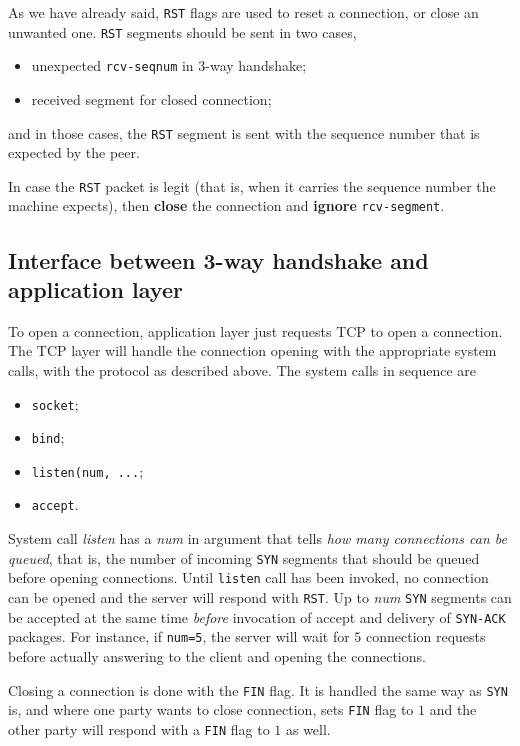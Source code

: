 \documentclass[10pt]{extbook}
\begin{document}
As we have already said, \texttt{RST} flags are used to reset a connection, or
close an unwanted one. \texttt{RST} segments should be sent in two cases,
\begin{itemize}
    \item unexpected \texttt{rcv-seqnum} in 3-way handshake;
    \item received segment for closed connection;
\end{itemize}
and in those cases, the \texttt{RST} segment is sent with the sequence number that is
expected by the peer.

In case the \texttt{RST} packet is legit (that is, when it carries the sequence number
the machine expects), then \textbf{close} the connection and \textbf{ignore}
\texttt{rcv-segment}.

\subsection{Interface between 3-way handshake and application layer}

To open a connection, application layer just requests TCP to open a connection.
The TCP layer will handle the connection opening with the appropriate system
calls, with the protocol as described above.
The system calls in sequence are

\begin{itemize}
	\item \texttt{socket};
    \item \texttt{bind};
    \item \texttt{listen(num, ...};
    \item \texttt{accept}.
\end{itemize}

System call \emph{listen} has a \emph{num} in argument that tells \emph{how many
connections can be queued}, that is, the number of incoming \texttt{SYN} segments that
should be queued before opening connections. Until \texttt{listen} call has
been invoked, no connection can be opened and the server will respond with
\texttt{RST}. Up to \emph{num} \texttt{SYN} segments can be accepted at the
same time \emph{before} invocation of accept and delivery of \texttt{SYN-ACK}
packages. For instance, if \texttt{num=5}, the server will wait for $5$
connection requests before actually answering to the client and opening the
connections.

Closing a connection is done with the \texttt{FIN} flag. It is handled the same
way as \texttt{SYN} is, and where one party wants to close connection, sets
\texttt{FIN} flag to $1$ and the other party will respond with a \texttt{FIN}
flag to $1$ as well.
\end{document}
